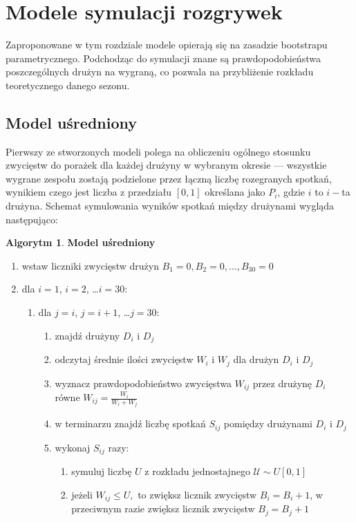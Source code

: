 \documentclass[inzynierska]{pwr_wmat_praca_dyplomowa}
\theoremstyle{plain}
\numberwithin{theorem}{chapter}
\theoremstyle{definition}
\numberwithin{theorem}{chapter}
\newtheorem{algorytm}[theorem]{Algorytm}
\begin{document}
\section{Modele symulacji rozgrywek}

Zaproponowane w tym rozdziale modele opierają się na zasadzie bootstrapu parametrycznego. Podchodząc do symulacji znane są prawdopodobieństwa poszczególnych drużyn na wygraną, co pozwala na przybliżenie rozkładu teoretycznego danego sezonu. 

\subsection{Model uśredniony}
Pierwszy ze stworzonych modeli polega na obliczeniu ogólnego stosunku zwycięstw do porażek dla każdej drużyny w wybranym okresie --- wszystkie wygrane zespołu zostają podzielone przez łączną liczbę rozegranych spotkań, wynikiem czego jest liczba z przedziału $[0,1]$ określana jako $P_{i}$, gdzie $i$ to $i-$ta drużyna. Schemat symulowania wyników spotkań między drużynami wygląda następująco:

\begin{algorytm} \textbf{Model uśredniony}
	\begin{enumerate}
	\item wstaw liczniki zwycięstw drużyn $B_1= 0,B_2= 0,\dots, B_{30}= 0$
	\item dla $i=1$, $i=2$, \dots $i=30$: 
	\begin{enumerate}
		\item dla $j=i$, $j=i+1$, \dots $j=30$: 
		\begin{enumerate}
			\item znajdź drużyny $D_i$ i $D_j$
		\item odczytaj średnie ilości zwycięstw $W_i$ i $W_j$ dla drużyn $D_i$ i $D_j$ 
		\item wyznacz prawdopodobieństwo zwycięstwa $W_{ij}$ przez drużynę  $D_i$ równe $W_{ij}=\frac{W_i}{W_i + W_j}$   
		\item w terminarzu znajdź liczbę spotkań $S_{ij}$ pomiędzy drużynami $D_i$ i $D_j$
		\item wykonaj $S_{ij}$ razy:
			\begin{enumerate}
				\item symuluj liczbę $U$ z rozkładu jednostajnego $\mathcal{U}\sim U[0,1]$ 
			\item jeżeli $W_{ij} \leq U,$ to zwiększ licznik zwycięstw $B_i=B_i+1$, w przeciwnym razie zwiększ licznik zwycięstw $B_j=B_j+1$
			\end{enumerate}
		\end{enumerate}
	\end{enumerate}
\end{enumerate}
\end{algorytm} 
 
\end{document}
